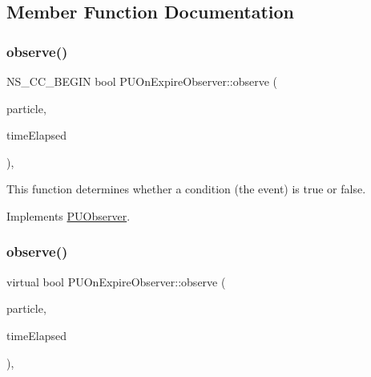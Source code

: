 \subsection{Member Function Documentation}
\mbox{\label{classPUOnExpireObserver_aaaddff7c0cc6987a1f341437167729af}} 
\subsubsection{\texorpdfstring{observe()}{observe()}\hspace{0.1cm}{\footnotesize\ttfamily [1/2]}}
{\footnotesize\ttfamily N\+S\+\_\+\+C\+C\+\_\+\+B\+E\+G\+IN bool P\+U\+On\+Expire\+Observer\+::observe (\begin{DoxyParamCaption}\item[{\hyperlink{structPUParticle3D}{P\+U\+Particle3D} $\ast$}]{particle,  }\item[{float}]{time\+Elapsed }\end{DoxyParamCaption})\hspace{0.3cm}{\ttfamily [override]}, {\ttfamily [virtual]}}

This function determines whether a condition (the event) is true or false. 

Implements \hyperlink{classPUObserver_a50f59cc3245e291b641463db5d3037f7}{P\+U\+Observer}.

\mbox{\label{classPUOnExpireObserver_ad14849989e86b0d3c24bfab468149b9d}} 
\subsubsection{\texorpdfstring{observe()}{observe()}\hspace{0.1cm}{\footnotesize\ttfamily [2/2]}}
{\footnotesize\ttfamily virtual bool P\+U\+On\+Expire\+Observer\+::observe (\begin{DoxyParamCaption}\item[{\hyperlink{structPUParticle3D}{P\+U\+Particle3D} $\ast$}]{particle,  }\item[{float}]{time\+Elapsed }\end{DoxyParamCaption})\hspace{0.3cm}{\ttfamily [override]}, {\ttfamily [virtual]}}

